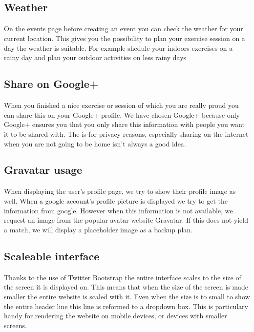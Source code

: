 \documentclass[11pt,a4paper]{scrartcl}
\begin{document}
\subsection{Weather}
\paragraph{}On the events page before creating an event you can check the weather for your current location. This gives you the possibility to plan your exercise session on a day the weather is suitable. For example shedule your indoors exercises on a rainy day and plan your outdoor activities on less rainy days
\subsection{Share on Google+}
\paragraph{}When you finished a nice exercise or session of which you are really proud you can share this on your Google+ profile. We have chosen Google+ because only Google+ ensures you that you only share this information with people you want it to be shared with. The is for privacy reasons, especially sharing on the internet when you are not going to be home isn't always a good idea.

\subsection{Gravatar usage}
\paragraph{}When displaying the user's profile page, we try to show their profile image as well. When a google account's profile picture is displayed we try to get the information from google. However when this information is not available, we request an image from the popular avatar website Gravatar. If this does not yield a match, we will display a placeholder image as a backup plan.
\subsection{Scaleable interface}
\paragraph{}Thanks to the use of Twitter Bootstrap the entire interface scales to the size of the screen it is displayed on. This means that when the size of the screen is made smaller the entire website is scaled with it. Even when the size is to small to show the entire header line this line is reformed to a dropdown box. This is particulary handy for rendering the website on mobile devices, or devices with smaller screens.
\end{document}

